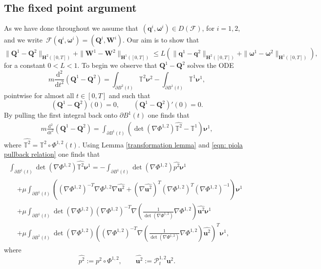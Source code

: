 \documentclass[a4paper]{amsart}
\numberwithin{equation}{section}
\newcommand{\grad}{\nabla}
\theoremstyle{plain}
\newcommand{\mbf}[1]{\mathbf{#1}}
\newcommand{\mbb}[1]{\mathbb{#1}}
\begin{document}
\subsection{The fixed point argument}
\label{subsection: fixed point}
    As we have done throughout we assume that~$(\mbf{q}^i, \boldsymbol{\omega}^i) \in D(\mathscr{F})$, for $i = 1,2$, and we write~$\mathscr{F}(\mbf{q}^i, \boldsymbol{\omega}^i) = (\mbf{Q}^i, \mbf{W}^i)$.
    Our aim is to show that
    \[ \|\mbf{Q}^1 - \mbf{Q}^2\|_{\mbf{H}^2([0,T])} +  \|\mbf{W}^1 - \mbf{W}^2\|_{\mbf{H}^1([0,T])} \leq L \left(\|\mbf{q}^1 - \mbf{q}^2\|_{\mbf{H}^2([0,T])} +  \|\boldsymbol{\omega}^1 - \boldsymbol{\omega}^2\|_{\mbf{H}^1([0,T])}\right),  \]
    for a constant $0 < L < 1$.
    To begin we observe that $\mbf{Q}^1 - \mbf{Q}^2$ solves the ODE
    \[ m \frac{\mathrm{d}^2}{\mathrm{d}t^2} (\mbf{Q}^1 - \mbf{Q}^2) = \int_{\partial B^2(t)} \mbb{T}^2 \boldsymbol{\nu}^2 - \int_{\partial B^1(t)} \mbb{T}^1 \boldsymbol{\nu}^1, \]
    pointwise for almost all $t \in [0,T]$ and such that
    \[ (\mbf{Q}^1 - \mbf{Q}^2)(0) = 0, \qquad (\mbf{Q}^1 - \mbf{Q}^2)'(0) = 0. \]
    By pulling the first integral back onto $\partial B^1(t)$ one finds that
    \begin{align}
    m \frac{\mathrm{d}^2}{\mathrm{d}t^2} (\mbf{Q}^1 - \mbf{Q}^2) = \int_{\partial B^1(t)} \left( \det(\grad \Phi^{1,2})\widehat{\mbb{T}^2} - {\mbb{T}^1} \right) \boldsymbol{\nu}^1, \label{contraction pf1}
    \end{align}
    where $\widehat{\mbb{T}^2} = \mbb{T}^2 \circ \Phi^{1,2}(t)$.
    Using Lemma \ref{transformation lemma} and \eqref{eqn: piola pullback relation} one finds that
    \begin{multline*}
        \int_{\partial B^1(t)} \det(\grad \Phi^{1,2})\widehat{\mbb{T}^2} \boldsymbol{\nu}^1= -\int_{\partial B^1(t)} \det(\grad \Phi^{1,2}) \widehat{p^2} \boldsymbol{\nu}^1\\
        \begin{aligned}
        &+ \mu \int_{\partial B^1(t)} \left( (\grad \Phi^{1,2})^{-T} \grad \Phi^{1,2} \grad \widehat{\mbf{u}^2} +   (\grad \widehat{\mbf{u}^2})^T(\grad \Phi^{1,2})^{T} (\grad \Phi^{1,2})^{-1}  \right) \boldsymbol{\nu}^1\\
        &+\mu \int_{\partial B^1(t)}\det(\grad\Phi^{1,2})(\grad \Phi^{1,2})^{-T}\grad \left( \frac{1}{\det(\grad\Phi^{1,2})} \grad \Phi^{1,2} \right)\widehat{\mbf{u}^2} \boldsymbol{\nu}^1\\
        &+\mu \int_{\partial B^1(t)}\det(\grad\Phi^{1,2})\left((\grad \Phi^{1,2})^{-T}\grad \left( \frac{1}{\det(\grad\Phi^{1,2})} \grad \Phi^{1,2} \right)\widehat{\mbf{u}^2} \right)^T\boldsymbol{\nu}^1,
        \end{aligned}
    \end{multline*}
    where
    \[ \widehat{p^2} := p^2 \circ \Phi^{1,2}, \qquad \widehat{\mbf{u}^2} := \mathcal{P}_t^{1,2} \mbf{u}^2. \]
\end{document}
